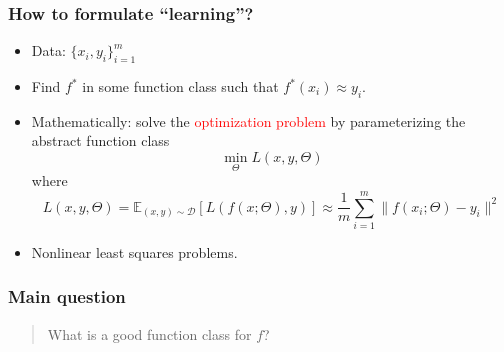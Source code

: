 \documentclass{beamer}
\newcommand{\red}[1]{\textcolor{red}{#1}}
\begin{document}
\begin{CJK*}{UTF8}{gbsn}
\begin{frame}
\frametitle{How to formulate ``learning''?}
\pause
\begin{itemize}
	\item Data: $\{x_i, y_i\}_{i=1}^m$
\pause
	\item Find $f^*$ in some function class such that $f^*(x_i) \approx y_i$.
\pause
	\item Mathematically: solve the \red{optimization problem} by parameterizing the abstract function class
	\begin{equation}\label{eq:supervise}
	\min_{\Theta} L(x,y,\Theta)
	\end{equation}
where 
{\footnotesize
$$
L(x,y,\Theta)=
{\mathbb E}_{(x,y)\sim \mathcal D}[L(f(x; \Theta), y)]\approx
\frac{1}{m} \sum_{i=1}^m\|f(x_i; \Theta) - y_i\|^2
$$
}

\item Nonlinear least squares problems.
\end{itemize}
\end{frame}

\begin{frame}
  \frametitle{Main question}

\begin{quote}\large
 What is a good function class for $f$?    
\end{quote}

  
\end{frame}


\end{CJK*}
\end{document}
